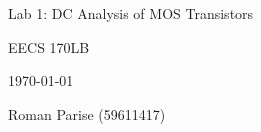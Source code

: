 \centering
\vspace{2.5cm}
{\huge Lab 1: DC Analysis of MOS Transistors \par}
{\Large EECS 170LB \par}
{\Large \today \par}
\vspace{1cm}
{\large Roman Parise (59611417)\par}
\vspace{1cm}
